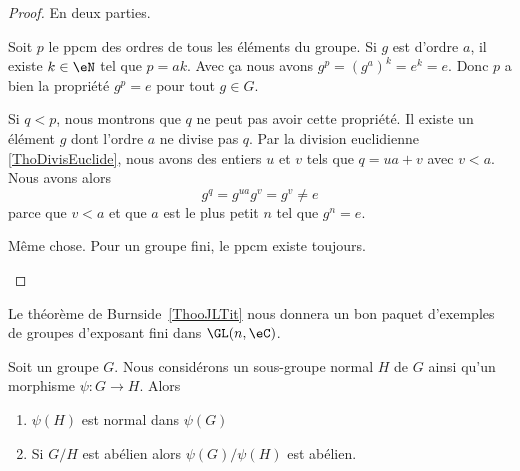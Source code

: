 \begin{proof}
	En deux parties.
	\begin{subproof}
		Soit \( p\) le ppcm des ordres de tous les éléments du groupe. Si \( g\) est d'ordre \( a\), il existe \( k\in \eN\) tel que \( p=ak\). Avec ça nous avons \(  g^{p}=(g^a)^k=e^k=e \). Donc \( p\) a bien la propriété \( g^p=e\) pour tout \( g\in G\).

		Si \( q<p\), nous montrons que \( q\) ne peut pas avoir cette propriété. Il existe un élément \( g\) dont l'ordre \( a\) ne divise pas \( q\). Par la division euclidienne \ref{ThoDivisEuclide}, nous avons des entiers \( u\) et \( v\) tels que \( q=ua+v\) avec \( v<a\). Nous avons alors
		\begin{equation}
			g^{q}=g^{ua}g^v=g^v\neq e
		\end{equation}
		parce que \( v<a\) et que \( a\) est le plus petit \( n\) tel que \( g^n=e\).

		Même chose. Pour un groupe fini, le ppcm existe toujours.
	\end{subproof}
\end{proof}

Le théorème de Burnside~\ref{ThooJLTit} nous donnera un bon paquet d'exemples de groupes d'exposant fini dans \( \GL(n,\eC)\).

\begin{proposition} \label{PropSRMJooIDPBoW}
	Soit un groupe \( G\). Nous considérons un sous-groupe normal \( H\) de \( G\) ainsi qu'un morphisme \( \psi\colon G\to H\). Alors
	\begin{enumerate}
		\item
		      \( \psi(H)\) est normal dans \( \psi(G)\)
		\item
		      Si \( G/H\) est abélien alors \( \psi(G)/\psi(H)\) est abélien.
	\end{enumerate}
\end{proposition}

